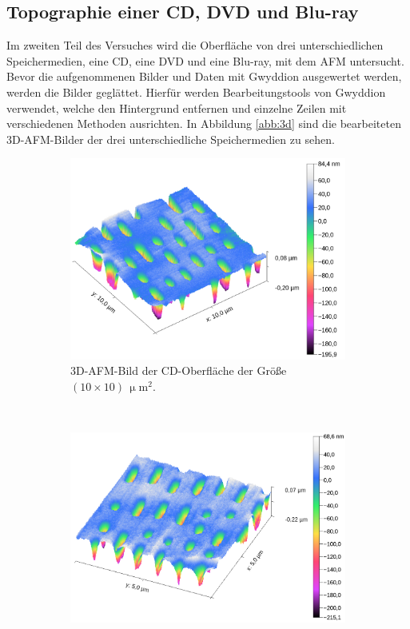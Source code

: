 \subsection{Topographie einer CD, DVD und Blu-ray}
Im zweiten Teil des Versuches wird die Oberfl\"ache von drei unterschiedlichen Speichermedien, eine CD, eine DVD und eine Blu-ray, mit dem AFM untersucht.
Bevor die aufgenommenen Bilder und Daten mit Gwyddion ausgewertet werden, werden die Bilder gegl\"attet.
Hierf\"ur werden Bearbeitungstools von Gwyddion verwendet, welche den Hintergrund entfernen und einzelne Zeilen mit verschiedenen Methoden ausrichten.
In Abbildung \ref{abb:3d} sind die bearbeiteten 3D-AFM-Bilder der drei unterschiedliche Speichermedien zu sehen.
\begin{figure}[H]
\centering
	\begin{subfigure}[t]{0.5\textwidth}
	\includegraphics[width=\textwidth]{AFM_auswertung/cd_3D.png}
	\caption{3D-AFM-Bild der CD-Oberfl\"ache der Gr\"o{\ss}e $(10 \times 10) \, \upmu \text{m}^2$.}
	\label{abb:cd_3d}
	\end{subfigure}
	~
	\begin{subfigure}[t]{0.5\textwidth}
	\includegraphics[width=\textwidth]{AFM_auswertung/dvd_3d.png}

\end{subfigure}
\end{figure}
